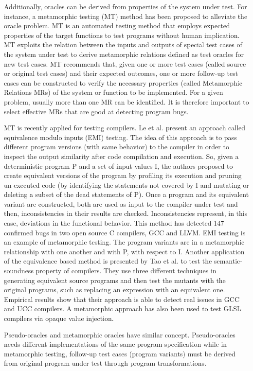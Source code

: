 \begin{itemize}
	Additionally, oracles can be derived from properties of the system under test. For instance, a metamorphic testing (MT) method has been proposed to alleviate the oracle problem\cite{chen2004case}. MT is an automated testing method that employs expected properties of the target functions to test programs without human implication. 
	MT exploits the relation between the inputs and outputs of special test cases of the system under test to derive metamorphic relations defined as test oracles for new test cases. 
	MT recommends that, given one or more test cases (called source or original test cases) and their expected outcomes, one or more follow-up test cases can be constructed to verify the necessary properties (called Metamorphic Relations MRs) of the system or function to be implemented.
	For a given problem, usually more than one MR can be identified. It is therefore important to select effective MRs that are good at detecting program bugs.

	MT is recently applied for testing compilers. Le et al.\cite{le2014compiler} present an approach called equivalence modulo inputs (EMI) testing. The idea of this approach is to pass different program versions (with same behavior) to the compiler in order to inspect the output similarity after code compilation and execution. So, given a deterministic program P and a set of input values I, the authors proposed to create equivalent versions of the program by profiling its execution and pruning un-executed code (by identifying the statements not covered by I and mutating or deleting a subset of the dead statements of P).
	Once a program and its equivalent variant are constructed, both are used as input to the compiler under test and then, inconsistencies in their results are checked. Inconsistencies represent, in this case, deviations in the functional behavior.
	This method has detected 147 confirmed bugs in two open source C compilers, GCC and LLVM.
	EMI testing is an example of metamorphic testing. The program variants are in a metamorphic relationship with one another and with P, with respect to I.
	Another application of the equivalence based method is presented by Tao et al.\cite{tao2010automatic} to test the semantic-soundness property of compilers. They use three different techniques in generating equivalent source programs and then test the mutants with the original programs, such as replacing an expression with an equivalent one. Empirical results show that their approach is able to detect real issues in GCC and UCC compilers.
	A metamorphic approach has also been used to test GLSL compilers via opaque value injection\cite{donaldson2016metamorphic}.
	
	Pseudo-oracles and metamorphic oracles have similar concept. Pseudo-oracles needs different implementations of the same program specification while in metamorphic testing, follow-up test cases (program variants) must be derived from original program under test through program transformations.
	

	
	
\end{itemize}


